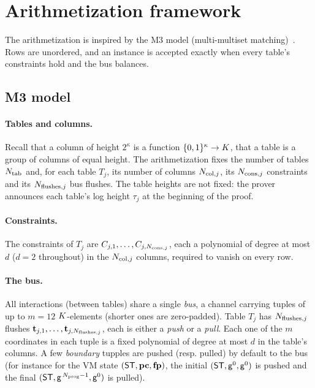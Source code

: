 \section{Arithmetization framework}\label{sec:arith}

The arithmetization is inspired by the M3 model (multi-multiset matching)~\cite{m3}. Rows are unordered, and an instance is accepted exactly when every table's constraints hold and the bus balances.

\subsection{M3 model}\label{sec:m3}

\paragraph{Tables and columns.} Recall that a column of height $2^{\kappa}$ is a function $\{0,1\}^{\kappa}\to K$, that a table is a group of columns of equal height. The arithmetization fixes the number of tables $N_{\mathrm{tab}}$ and, for each table $T_j$, its number of columns $N_{\mathrm{col},j}$, its $N_{\mathrm{cons},j}$ constraints and its $N_{\mathrm{flushes},j}$ bus flushes. The table heights are not fixed: the prover announces each table's log height $\tau_j$ at the beginning of the proof.

\paragraph{Constraints.} The constraints of $T_j$ are $C_{j,1},\dots,C_{j,N_{\mathrm{cons},j}}$, each a polynomial of degree at most $d$ ($d=2$ throughout) in the $N_{\mathrm{col},j}$ columns, required to vanish on every row.

\paragraph{The bus.} All interactions (between tables) share a single \emph{bus}, a channel carrying tuples of up to $m=12$ $K$-elements (shorter ones are zero-padded). Table $T_j$ has $N_{\mathrm{flushes},j}$ flushes $\mathbf{t}_{j,1},\dots,\mathbf{t}_{j,N_{\mathrm{flushes},j}}$, each is either a \emph{push} or a \emph{pull}. Each one of the $m$ coordinates in each tuple is a fixed polynomial of degree at most $d$ in the table's columns. A few \emph{boundary} tupples are pushed (resp. pulled) by default to the bus (for instance for the VM state $(\mathsf{ST}, \mathbf{pc}, \mathbf{fp})$, the initial $(\mathsf{ST}, \mathsf{g}^0, \mathsf{g}^0)$ is pushed and the final $(\mathsf{ST}, \mathsf{g}^{\,N_{\mathrm{prog}}-1}, \mathsf{g}^{0})$ is pulled).

